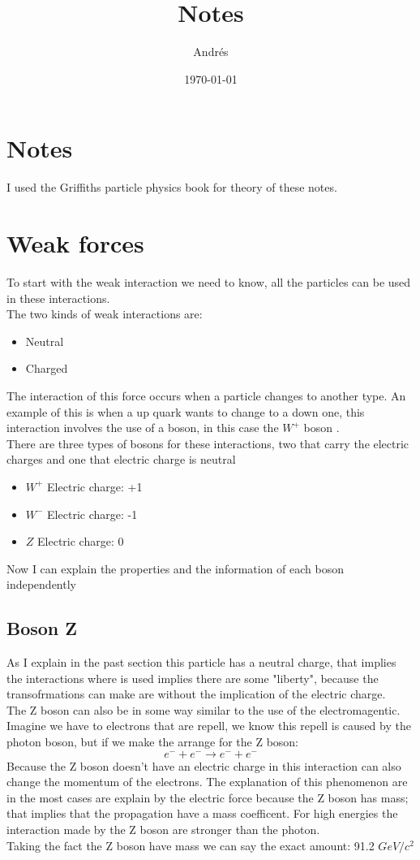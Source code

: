 \documentclass[11pt,a4paper]{article}
\title{Notes}
\author{Andrés}
\date{\today}
\begin{document}
\newpage
\section{Notes}
I used the Griffiths particle physics book for theory of these notes.

\section{Weak forces}
To start with the weak interaction we need to know, all the particles can be used in these interactions.\\
The two kinds of weak interactions are:
\begin{itemize}
    \item Neutral
    \item Charged
\end{itemize}
The interaction of this force occurs when a particle changes to another type. An example of this is when a up quark wants to change to a down one, this interaction involves the use of a boson, in this case the $W^{+}$ boson .\\
There are three types of bosons for these interactions, two that carry the electric charges and one that electric charge is neutral
\begin{itemize}
    \item $W^+$ Electric charge: +1
    \item $W^-$ Electric charge: -1
    \item $Z$ Electric charge: 0
\end{itemize}
Now I can explain the properties and the information of each boson independently
\subsection{Boson Z}
As I explain in the past section this particle has a neutral charge, that implies the interactions where is used implies there are some "liberty", because the transofrmations can make are without the implication of the electric charge.\\
The Z boson can also be in some way similar to the use of the electromagentic. Imagine we have to electrons that are repell, we know this repell is caused by the photon boson, but if we make the arrange for the Z boson:\\
\begin{equation}
    e^- + e^- \rightarrow e^-+e^-
\end{equation}
Because the Z boson doesn't have an electric charge in this interaction can also change the momentum of the electrons. The explanation of this phenomenon are in the most cases are explain by the electric force because the Z boson has mass; that implies that the propagation have a mass coefficent. For high energies the interaction made by the Z boson are stronger than the photon.\\
Taking the fact the Z boson have mass we can say the exact amount: 91.2 $GeV/c^2$
\end{document}
